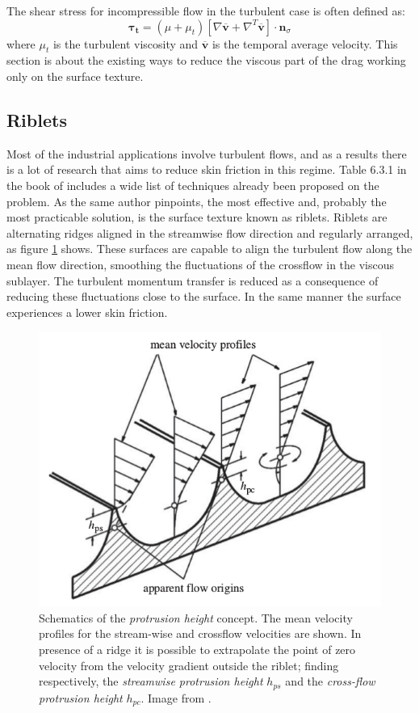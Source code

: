 \noindent The shear stress for incompressible flow in the turbulent case is often defined as:
\begin{equation}
\boldsymbol{\tau_t} =  (\mu + \mu_t)\left[ \nabla \mathbf{\overline{v}} +  \nabla^T  \mathbf{\overline{v}} \right] \cdot  \mathbf{n}_{\sigma}
\end{equation}
where $\mu_t$ is the turbulent viscosity and $\mathbf{\overline{v}}$ is the temporal average velocity.
This section is about the existing ways to reduce the viscous part of the drag working only on the surface texture.

\subsection{Riblets}
Most of the industrial applications involve turbulent flows, and as a results there is a lot of research that aims to reduce skin friction in this regime.
Table 6.3.1 in the book of \citet{mclean2012understanding} includes a wide list of techniques already been proposed on the problem.
As the same author pinpoints, the most effective and, probably the most practicable solution, is the surface texture known as riblets.
Riblets are alternating ridges aligned in the streamwise flow direction and regularly arranged, as figure \ref{fig:riblets1} shows.
These surfaces are capable to align the turbulent flow along the mean flow direction, smoothing the fluctuations of the crossflow in the viscous sublayer.
The turbulent momentum transfer is reduced as a consequence of reducing these fluctuations close to the surface. In the same manner the surface experiences a lower skin friction.

\begin{figure}[h]
	\centering
	\includegraphics[width=0.7\linewidth]{chapter_1/riblets3}
	\caption{Schematics of the  \textit{protrusion height} concept. The mean velocity profiles for the stream-wise and crossflow velocities are shown. In presence of a ridge it is possible to extrapolate the point of zero velocity from the velocity gradient outside the riblet; finding respectively, the \textit{streamwise protrusion height} $h_{ps}$ and the \textit{cross-flow protrusion height} $h_{pc}$. Image from \citet{bechert1997experiments}.}
	\label{fig:riblets1}
\end{figure}

